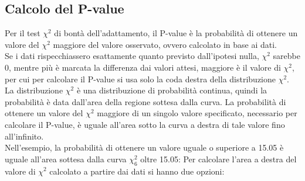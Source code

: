 \documentclass[drafts, 10pt]{book}
\begin{document}
\subsection{Calcolo del P-value}
Per il test $\chi^2$ di bontà dell'adattamento, il P-value è la probabilità di ottenere un valore del $\chi^2$ maggiore del valore osservato, ovvero calcolato in base ai dati.
\\
Se i dati rispecchiassero esattamente quanto previsto dall'ipotesi nulla, $\chi^2$ sarebbe 0, mentre più è marcata la differenza dai valori attesi, maggiore è il valore di $\chi^2$, per cui per calcolare il P-value si usa solo la coda destra della distribuzione $\chi^2$.
\\
La distribuzione $\chi^2$ è una distribuzione di probabilità continua, quindi la probabilità è data dall'area della regione sottesa dalla curva. La probabilità di ottenere un valore del $\chi^2$ maggiore di un singolo valore specificato, necessario per calcolare il P-value, è uguale all'area sotto la curva a destra di tale valore fino all'infinito.
\\
Nell'esempio, la probabilità di ottenere un valore uguale o superiore a 15.05 è uguale all'area sottesa dalla curva $\chi^2_6$ oltre 15.05:
Per calcolare l'area a destra del valore di $\chi^2$ calcolato a partire dai dati si hanno due opzioni:
\end{document}
